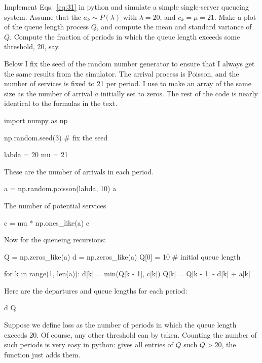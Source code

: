 \begin{exercise}
  Implement Eqs.~\ref{eq:31} in python and simulate a
  simple single-server queueing system. Assume that the $a_k \sim P(\lambda)$ with $\lambda=20$, and $c_k =\mu=21$. Make a plot of the queue length process $Q$, and compute the mean and standard variance of $Q$. Compute the fraction of periods in which the queue length exceeds some threshold, 20, say. 
  \begin{solution}
    Below I fix the seed of the random number generator to ensure that
    I always get the same results from the simulator.  The arrival
    process is Poisson, and the number of services is fixed to 21 per
    period. I use  to make an array of the
    same size as the number of arrival $a$ initially set to zeros. The
    rest of the code is nearly identical to the formulas in the text.

\begin{pyconsole}
import numpy as np

np.random.seed(3) # fix the seed

labda = 20
mu = 21
\end{pyconsole}

These are the number of arrivals in each period.

\begin{pyconsole}
a = np.random.poisson(labda, 10)
a
\end{pyconsole}

The number of potential services
\begin{pyconsole}
c = mu * np.ones_like(a)
c
\end{pyconsole}

Now for the queueing recursions:

\begin{pyconsole}
Q = np.zeros_like(a)
d = np.zeros_like(a)
Q[0] = 10  # initial queue length

for k in range(1, len(a)):
    d[k] = min(Q[k - 1], c[k])
    Q[k] = Q[k - 1] - d[k] + a[k]

\end{pyconsole}

Here are the departures and queue lengths for each period:
\begin{pyconsole}
d
Q
\end{pyconsole}


Suppose we define loss as the number of periods in which the queue length exceeds
20. Of course, any other threshold can by taken. Counting the number
of such periods is very easy in python:  gives all
entries of $Q$ such $Q>20$, the function  just adds
them. 


\end{solution}
\end{exercise}
